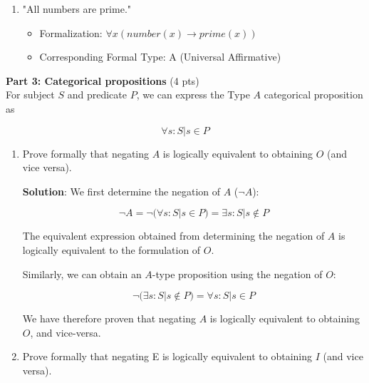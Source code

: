 \documentclass[12pt]{article}
\begin{document}
\begin{spacing}{1.5}
\begin{enumerate}
		\item "All numbers are prime."
		      		      		      		      		      
		      \begin{itemize}
		      	\item Formalization: $\forall x(number(x) \rightarrow prime(x))$
		      	\item Corresponding Formal Type: A (Universal Affirmative)\\
		      \end{itemize}
		      		      		      		      		              
	\end{enumerate}
					
	\noindent \textbf{Part 3: Categorical propositions} (4 pts)\\
	For subject $S$ and predicate $P$, we can express the Type $A$ categorical proposition as
					
	$$\forall s : S | s \in P$$
					
	\begin{enumerate}
		\item Prove formally that negating $A$ is logically equivalent to obtaining $O$ (and vice versa).
		      		      		      		      		      
		      \textbf{Solution}: We first determine the negation of $A$ ($\neg A$):
		      		      		      		      		      
		      $$\neg A = \neg (\forall s : S | s \in P ) = \exists s : S | s \notin P$$
		      		      		      		      		      
		      The equivalent expression obtained from determining the negation of $A$ is logically equivalent to the formulation of $O$.
		      		      		      		      		      
		      Similarly, we can obtain an $A$-type proposition using the negation of $O$:
		      		      		      		      		      
		      $$\neg (\exists s : S | s \notin P) = \forall s : S | s \in P$$
		      		      		      		      		      
		      We have therefore proven that negating $A$ is logically equivalent to obtaining $O$, and vice-versa.
		      		      		      		      		              
		\item Prove formally that negating E is logically equivalent to obtaining $I$ (and vice versa).
		      		      		      		      		      

\end{enumerate}
\end{spacing}
\end{document}
